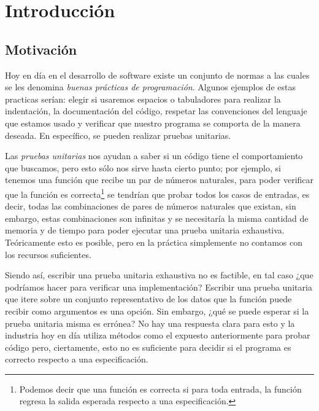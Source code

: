 \chapter{Introducción}

\section{Motivación}
\label{motivation}
Hoy en día en el desarrollo de software existe un conjunto de normas a las cuales se les 
denomina \textit{buenas pr\'acticas de programaci\'on}. Algunos ejemplos de estas practicas ser\'ian: elegir si usaremos espacios o tabuladores para realizar la 
indentaci\'on, la documentaci\'on del c\'odigo, respetar las convenciones del lenguaje que estamos 
usado y verificar que nuestro programa se comporta de la manera deseada. En espec\'ifico, se pueden 
realizar pruebas unitarias.

Las \textit{pruebas unitarias} nos ayudan a saber si un código tiene el comportamiento
que buscamos, pero esto s\'olo nos sirve hasta cierto punto; por ejemplo, si tenemos una funci\'on
que recibe un par de números naturales, para poder verificar que la funci\'on es correcta\footnote{Podemos decir que una funci\'on es correcta si para toda entrada, la funci\'on regresa la salida esperada respecto a una especificaci\'on.} se 
tendrían que probar todos los casos de entradas, es decir, todas las combinaciones de pares de 
números naturales que existan, sin embargo, estas combinaciones son infinitas y se necesitaría la 
misma cantidad de memoria y de tiempo para poder ejecutar una prueba unitaria exhaustiva. 
Teóricamente esto es posible, pero en la pr\'actica simplemente no contamos con los recursos 
suficientes.

Siendo as\'i, escribir una prueba unitaria exhaustiva no es factible, en tal caso ¿que podríamos
hacer para verificar una implementaci\'on? Escribir una prueba unitaria que itere sobre un conjunto
representativo de los datos que la funci\'on puede recibir como argumentos es una opci\'on. Sin embargo, ¿qu\'e se 
puede esperar si la prueba unitaria misma es errónea? No hay una respuesta clara para esto y la 
industria hoy en día utiliza métodos como el expuesto anteriormente para probar c\'odigo pero, 
ciertamente, esto no es suficiente para decidir si el programa es correcto respecto a una 
especificaci\'on.


